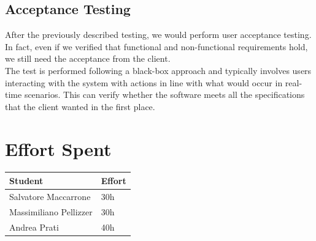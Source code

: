 \documentclass[10pt]{report}
\begin{document}
\section{Acceptance Testing}
After the previously described testing, we would perform user acceptance testing. In fact, even if we verified that functional and non-functional requirements hold, we still need the acceptance from the client.\\
The test is performed following a black-box approach and typically involves users interacting with the system with actions in line with what would occur in real-time scenarios. This can verify whether the software meets all the specifications that the client wanted in the first place.
\chapter{Effort Spent}
\begin{table}[H]
\centering
\begin{tabular}{|l|l|}
\hline
\textbf{Student}       & \textbf{Effort} \\ \hline
Salvatore Maccarrone   & 30h             \\ \hline
Massimiliano Pellizzer & 30h             \\ \hline
Andrea Prati           & 40h             \\ \hline
\end{tabular}
\end{table}
\end{document}
